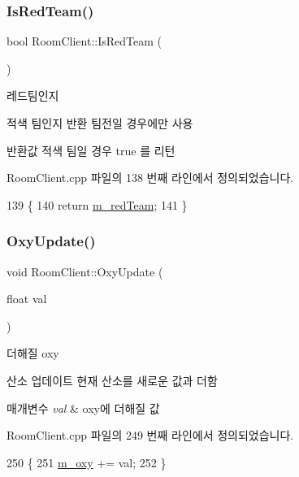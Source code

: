 \subsubsection{\texorpdfstring{Is\+Red\+Team()}{IsRedTeam()}}
{\footnotesize\ttfamily bool Room\+Client\+::\+Is\+Red\+Team (\begin{DoxyParamCaption}{ }\end{DoxyParamCaption})}



레드팀인지 

적색 팀인지 반환  팀전일 경우에만 사용

\begin{DoxyReturn}{반환값}
적색 팀일 경우 true 를 리턴 
\end{DoxyReturn}


Room\+Client.\+cpp 파일의 138 번째 라인에서 정의되었습니다.


\begin{DoxyCode}
139 \{
140     \textcolor{keywordflow}{return} \hyperlink{class_room_client_a4552bc59af3cf8137a506cdfbe7540cb}{m\_redTeam}; 
141 \}
\end{DoxyCode}
\mbox{\label{class_room_client_afa031772ae59a775b4f4a5d8981aabb6}} 
\subsubsection{\texorpdfstring{Oxy\+Update()}{OxyUpdate()}}
{\footnotesize\ttfamily void Room\+Client\+::\+Oxy\+Update (\begin{DoxyParamCaption}\item[{float}]{val }\end{DoxyParamCaption})}



더해질 oxy 

산소 업데이트  현재 산소를 새로운 값과 더함


\begin{DoxyParams}{매개변수}
{\em val} & oxy에 더해질 값 \\
\hline
\end{DoxyParams}


Room\+Client.\+cpp 파일의 249 번째 라인에서 정의되었습니다.


\begin{DoxyCode}
250 \{
251     \hyperlink{class_room_client_a8c0bd64aa8b2d03f23b9a1ab5c2c2c1a}{m\_oxy} += val;
252 \}
\end{DoxyCode}
\mbox{\label{class_room_client_aa1914f4585c26f5073c3f8639d38aa41}} 
